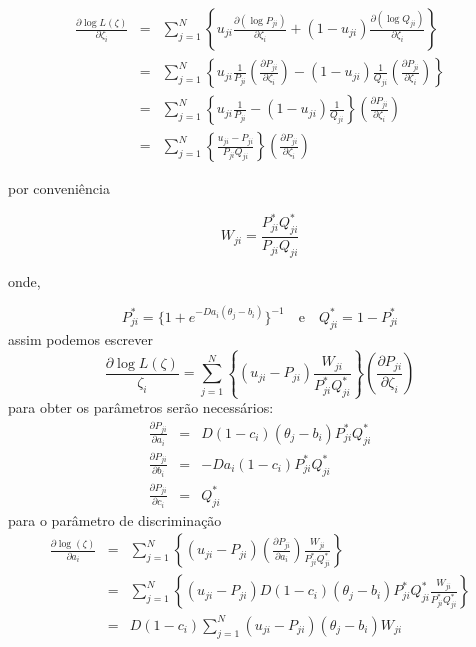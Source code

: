 	\begin{eqnarray}
		\displaystyle\frac{\partial\log L(\zeta)}{\partial\zeta_i} & = &\displaystyle\sum_{j = 1}^{N}\left\{u_{ji}\displaystyle\frac{\partial(\log P_{ji})}{\partial\zeta_i} + (1 - u_{ji})\displaystyle\frac{\partial(\log Q_{ji})}{\partial\zeta_i}\right\}\\
		& = & \displaystyle\sum_{j = 1}^{N}\left\{
		u_{ji}\displaystyle\frac{1}{P_{ji}}\left(\displaystyle\frac{\partial P_{ji}}{\partial \zeta_i}\right) - (1 - u_{ji})\displaystyle\frac{1}{Q_{ji}}\left(\displaystyle\frac{\partial P_{ji}}{\partial \zeta_i}\right)
		\right\}\\
		& = & \displaystyle\sum_{j = 1}^{N}\left\{u_{ji}\displaystyle\frac{1}{P_{ji}} - (1 - u_{ji})\displaystyle\frac{1}{Q_{ji}}\right\}\left(\displaystyle\frac{\partial P_{ji}}{\partial \zeta_i}\right)\\
		& = & \displaystyle\sum_{j = 1}^{N}
		\left\{
		\displaystyle\frac{u_{ji} - P_{ji}}{P_{ji}Q_{ji}}
		\right\}				
		\left(
		\displaystyle\frac{\partial P_{ji}}{\partial \zeta_i}
		\right)
	\end{eqnarray}
	
	por conveniência
	
	$$
	    W_{ji} = \displaystyle\frac{P_{ji}^{*}Q_{ji}^{*}}{P_{ji}Q_{ji}}
	$$
	
	onde,
	
	$$
	    P_{ji}^{*} = \{1 + e^{-Da_i(\theta_j - b_i)}\}^{-1} \quad  \mbox{e} \quad Q_{ji}^{*} = 1 - P_{ji}^{*}
	$$
	assim podemos escrever
	$$
	    \displaystyle\frac{\partial\log L(\zeta)}{\zeta_i} = \displaystyle\sum_{j = 1}^{N}
	    \left\{
	    (u_{ji} - P_{ji})\displaystyle\frac{W_{ji}}{P_{ji}^{*}Q_{ji}^{*}}			
	    \right\}
	    \left(
	    \displaystyle\frac{\partial P_{ji}}{\partial \zeta_i}
	    \right)
	$$
	para obter os parâmetros serão necessários:
	\begin{eqnarray}
		\displaystyle\frac{\partial P_{ji}}{\partial a_i} &=& D(1 - c_i)(\theta_j - b_i)P_{ji}^{*}Q_{ji}^{*}\\
		\displaystyle\frac{\partial P_{ji}}{\partial b_i} &=& -Da_i(1 -c_i)P_{ji}^{*}Q_{ji}^{*}\\
		\displaystyle\frac{\partial P_{ji}}{\partial c_i} &=& Q_{ji}^{*}
	\end{eqnarray}
	para o parâmetro de discriminação
	\begin{eqnarray}
		\displaystyle\frac{\partial \log(\zeta)}{\partial a_i} & = & \sum_{j = 1}^{N}\left\{
		(u_{ji} - P_{ji})\left(\displaystyle\frac{\partial P_{ji}}{\partial a_i}\right)\displaystyle\frac{W_{ji}}{P_{ji}^{*}Q_{ji}^{*}}
		\right\}\\
		&=& \sum_{j = 1}^{N}\left\{
		(u_{ji} - P_{ji})D(1 - c_i)(\theta_j - b_i)P_{ji}^{*}Q_{ji}^{*}\displaystyle\frac{W_{ji}}{P_{ji}^{*}Q_{ji}^{*}}
		\right\}\\
		& = & D(1 - c_i)\sum_{j = 1}^{N}(u_{ji} - P_{ji})(\theta_j - b_i)W_{ji}		
	\end{eqnarray}		
	
